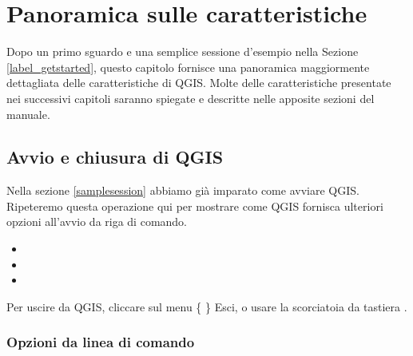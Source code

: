 
\chapter{Panoramica sulle caratteristiche}\label{feature_glance}


Dopo un primo sguardo e una semplice sessione d'esempio nella Sezione \ref{label_getstarted},
questo capitolo fornisce una panoramica maggiormente dettagliata delle caratteristiche di QGIS. 
Molte delle caratteristiche presentate nei successivi capitoli saranno spiegate
e descritte nelle apposite sezioni del manuale.

\section{Avvio e chiusura di QGIS}\label{label_startinqgis}

Nella sezione \ref{samplesession} abbiamo già  imparato come avviare QGIS. Ripeteremo 
questa operazione qui per mostrare come QGIS fornisca ulteriori opzioni all'avvio da riga di comando. 

\begin{itemize}
\item {} 
\item {}
\item {}
\end{itemize} 

Per uscire da QGIS, cliccare sul menu \{\nix{} \} \arrow Esci,
o usare la scorciatoia da tastiera .

\subsection{Opzioni da linea di comando}
\label{label_commandline}

